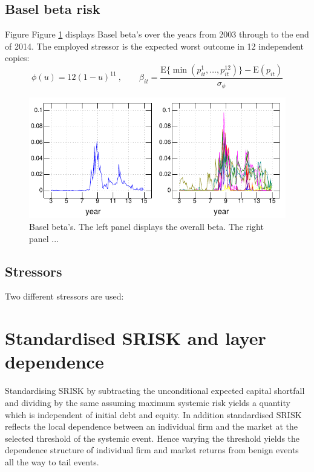 \documentclass[authoryear]{elsarticle}
\newcommand{\E}{\mathrm{E}}
\newcommand{\fref}[1]{Figure \ref{#1}}
\newcommand{\cq}{\ , \qquad}
\begin{document}
\subsection{Basel beta risk}

Figure \fref{Bbeta} displays Basel beta's over the years from 2003 through to the end of 2014.  The employed stressor is the expected worst outcome in 12 independent copies:
$$
\phi(u) = 12(1-u)^{11}\cq \beta_{it} = \frac{\E\{\min(p^1_{it},\ldots,p^{12}_{it})\}-\E(p_{it})}{\sigma_\phi}
$$

\begin{figure}[htbp]
\begin{center}
\includegraphics{Bbeta.pdf}
\caption{Basel beta's.  The left panel displays the overall beta.   The right panel ...}
\label{Bbeta}
\end{center}
\end{figure}

\subsection{Stressors}

Two different stressors are used:   



\section{Standardised SRISK and layer dependence}

Standardising SRISK by subtracting the unconditional expected capital shortfall and dividing by the same assuming maximum systemic risk yields a quantity which is independent of initial debt and equity. In addition standardised SRISK reflects the local dependence between an individual firm and the market at the selected threshold of the systemic event. Hence varying the threshold yields the dependence structure of individual firm and market returns from benign events all the way to tail events.
\end{document}

